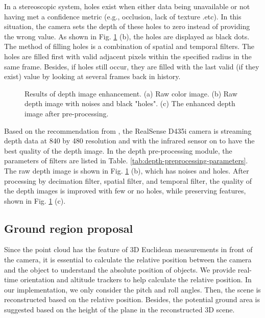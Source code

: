 \documentclass{ieeeaccess}
\begin{document}
In a stereoscopic system, holes exist when either data being unavailable or not having met a confidence metric (e.g., occlusion, lack of texture .etc). In this situation, the camera sets the depth of these holes to zero instead of providing the wrong value. As shown in Fig. \ref{fig:depth-pre-processing} (b), the holes are displayed as black dots. The method of filling holes is a combination of spatial and temporal filters. The holes are filled first with valid adjacent pixels within the specified radius in the same frame. Besides, if holes still occur, they are filled with the last valid (if they exist) value by looking at several frames back in history.  
\begin{figure}[t]
    \centering
    \caption{Results of depth image enhancement. (a) Raw color image. (b) Raw depth image with noises and black "holes". (c) The enhanced depth image after pre-processing.}%
    \label{fig:depth-pre-processing}
\end{figure}

Based on the recommendation from \cite{grunnet2018depth}, the RealSense D435i camera is streaming depth data at 840 by 480 resolution and with the infrared sensor on to have the best quality of the depth image. In the depth pre-processing module, the parameters of filters are listed in Table. \ref{tab:depth-preprocessing-parameters}. The raw depth image is shown in Fig. \ref{fig:depth-pre-processing} (b), which has noises and holes. After processing by decimation filter, spatial filter, and temporal filter, the quality of the depth images is improved with few or no holes, while preserving features, shown in Fig. \ref{fig:depth-pre-processing} (c).

\subsection{Ground region proposal}
Since the point cloud has the feature of 3D Euclidean measurements in front of the camera, it is essential to calculate the relative position between the camera and the object to understand the absolute position of objects. We provide real-time orientation and altitude trackers to help calculate the relative position. In our implementation, we only consider the pitch and roll angles. Then, the scene is reconstructed based on the relative position. Besides, the potential ground area is suggested based on the height of the plane in the reconstructed 3D scene.
\end{document}
